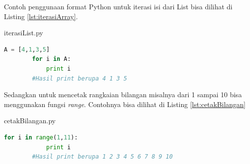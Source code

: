 Contoh penggunaan format Python untuk iterasi isi dari List bisa dilihat di Listing \ref{lst:iterasiArray}.
\begin{listprog}{iterasiList.py}
	\label{lst:iterasiArray}
	\begin{lstlisting}[language=Python]
		A = [4,1,3,5]
		for i in A:
			print i
		#Hasil print berupa 4 1 3 5
	\end{lstlisting}
\end{listprog}

Sedangkan untuk mencetak rangkaian bilangan misalnya dari 1 sampai 10 bisa menggunakan fungsi \textit{range}. Contohnya bisa dilihat di Listing \ref{lst:cetakBilangan}
\begin{listprog}{cetakBilangan.py}
	\label{lst:cetakBilangan}
	\begin{lstlisting}[language=Python]
		for i in range(1,11):
			print i
		#Hasil print berupa 1 2 3 4 5 6 7 8 9 10
	\end{lstlisting}
\end{listprog}

